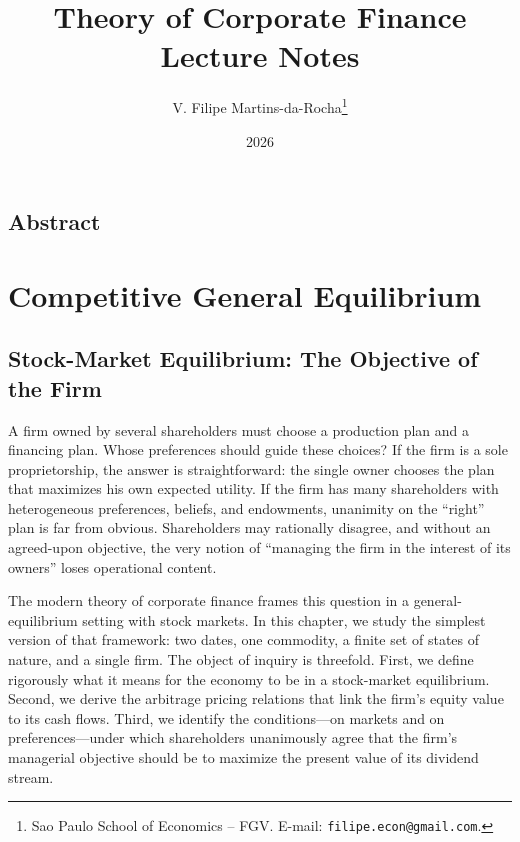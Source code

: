 \documentclass[11pt,a4paper,oneside]{book}
\title{Theory of Corporate Finance \\[4pt]
       \large Lecture Notes}
\author{V. Filipe Martins-da-Rocha\thanks{Sao Paulo School of Economics -- FGV. E-mail: \texttt{filipe.econ@gmail.com}.}}
\date{2026}
\theoremstyle{plain}
\theoremstyle{definition}
\theoremstyle{remark}
\numberwithin{equation}{chapter}
\begin{document}

\frontmatter
\maketitle

\chapter*{Abstract}


\tableofcontents

\mainmatter


\part{Competitive General Equilibrium}


\chapter{Stock-Market Equilibrium: The Objective of the Firm}
\label{ch:objective}

A firm owned by several shareholders must choose a production plan and a financing plan.
Whose preferences should guide these choices?
If the firm is a sole proprietorship, the answer is straightforward: the single owner chooses the plan that maximizes his own expected utility.
If the firm has many shareholders with heterogeneous preferences, beliefs, and endowments, unanimity on the ``right'' plan is far from obvious.
Shareholders may rationally disagree, and without an agreed-upon objective, the very notion of ``managing the firm in the interest of its owners'' loses operational content.

The modern theory of corporate finance frames this question in a general-equilibrium setting with stock markets.
In this chapter, we study the simplest version of that framework: two dates, one commodity, a finite set of states of nature, and a single firm.
The object of inquiry is threefold.
First, we define rigorously what it means for the economy to be in a stock-market equilibrium.
Second, we derive the arbitrage pricing relations that link the firm's equity value to its cash flows.
Third, we identify the conditions---on markets and on preferences---under which shareholders unanimously agree that the firm's managerial objective should be to maximize the present value of its dividend stream.
\end{document}
